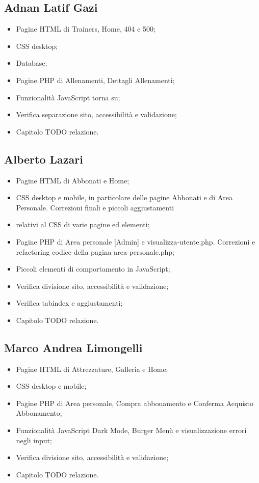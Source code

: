 \documentclass[a4paper]{article}
\begin{document}
	\subsection{Adnan Latif Gazi}
	\begin{itemize}
		\item Pagine HTML di Trainers, Home, 404 e 500;
		\item CSS desktop;
		\item Database;
		\item Pagine PHP di Allenamenti, Dettagli Allenamenti;
		\item Funzionalità JavaScript torna su;
		\item Verifica separazione sito, accessibilità e validazione;
		\item Capitolo TODO relazione.        
	\end{itemize}

	\subsection{Alberto Lazari}
	\begin{itemize}
		\item Pagine HTML di Abbonati e Home;
		\item CSS desktop e mobile, in particolare delle pagine Abbonati e di Area Personale. Correzioni finali e piccoli aggiustamenti \item relativi al CSS di varie pagine ed elementi;
		\item Pagine PHP di Area personale [Admin] e visualizza-utente.php. Correzioni e refactoring codice della pagina area-personale.php;
		\item Piccoli elementi di comportamento in JavaScript;
		\item Verifica divisione sito, accessibilità e validazione;
		\item Verifica tabindex e aggiustamenti;
		\item Capitolo TODO relazione.        
	\end{itemize}

	\subsection{Marco Andrea Limongelli}
	\begin{itemize}
		\item Pagine HTML di Attrezzature, Galleria e Home;
		\item CSS desktop e mobile;
		\item Pagine PHP di Area personale, Compra abbonamento e Conferma Acquisto Abbonamento;
		\item Funzionalità JavaScript Dark Mode, Burger Menù e visualizzazione errori negli input;
		\item Verifica divisione sito, accessibilità e validazione;
		\item Capitolo TODO relazione.        
	\end{itemize}
\end{document}
